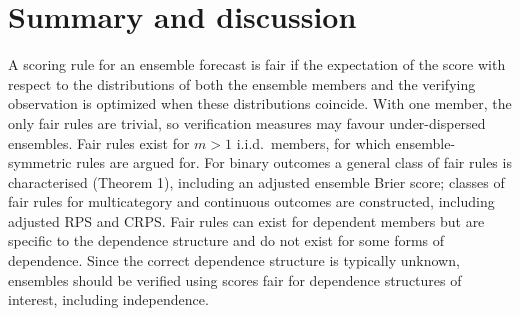 \documentclass{article}
\begin{document}
\section{Summary and discussion}
A scoring rule for an ensemble forecast is fair if the expectation of the score
with respect to the distributions of both the ensemble members and the
verifying observation is optimized when these distributions coincide. With one
member, the only fair rules are trivial, so verification measures may favour
under-dispersed ensembles. Fair rules exist for $m>1$ i.i.d.\ members, for which
ensemble-symmetric rules are argued for. For binary outcomes a general class of
fair rules is characterised (Theorem 1), including an adjusted ensemble Brier
score; classes of fair rules for multicategory and continuous outcomes are
constructed, including adjusted RPS and CRPS. Fair rules can exist for
dependent members but are specific to the dependence structure and do not exist
for some forms of dependence. Since the correct dependence structure is
typically unknown, ensembles should be verified using scores fair for
dependence structures of interest, including independence.

\appendix
\end{document}
